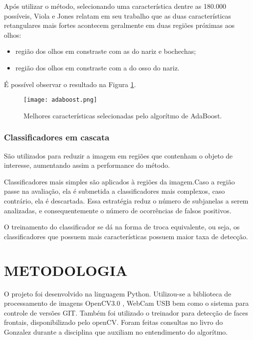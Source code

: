 \documentclass[a4paper,12pt]{article}
\begin{document}
\hspace{4ex}Após utilizar o método, selecionando uma característica dentre as 180.000 possíveis, Viola e Jones relatam em seu trabalho que as duas características retangulares mais fortes acontecem geralmente em duas regiões próximas aos olhos:
\begin{itemize}
	\item região dos olhos em constraste com as do nariz e bochechas;
	\item região dos olhos em constraste com a do osso do nariz.
\end{itemize}

\hspace{4ex}É possível observar o resultado na Figura \ref{adboost}.

\begin{figure}[h!]
	\centering
	\texttt{[image: adaboost.png]}
	\caption{Melhores características selecionadas pelo algorítmo de AdaBoost.}
	\label{adboost}
\end{figure}



\subsubsection{Classificadores em cascata}
\hspace{4ex}São utilizados para reduzir a imagem em regiões que contenham o objeto de interesse, aumentando assim a performance do método.

\hspace{4ex}Classificadores mais simples são aplicados à regiões da imagem.Caso a região passe na avaliação, ela é submetida a classificadores mais complexos, caso contrário, ela é descartada. Essa estratégia reduz o número de subjanelas a serem analizadas, e consequentemente o número de ocorrências de falsos positivos.

\hspace{4ex}O treinamento do classificador se dá na forma de troca equivalente, ou seja, os classificadores que possuem mais características possuem maior taxa de detecção.
\thispagestyle{main}
\section{METODOLOGIA}
\hspace{4ex}O projeto foi desenvolvido na linguagem Python. Utilizou-se a biblioteca de processamento de imagens OpenCV3.0\cite{opencv} , WebCam USB bem como o sistema para controle de versões GIT. Também foi utilizado o treinador para detecção de faces frontais, disponibilizado pelo openCV. Foram feitas consultas no livro do Gonzalez\cite{PDI} durante a disciplina que auxiliam no entendimento do algorítmo.
\end{document}
